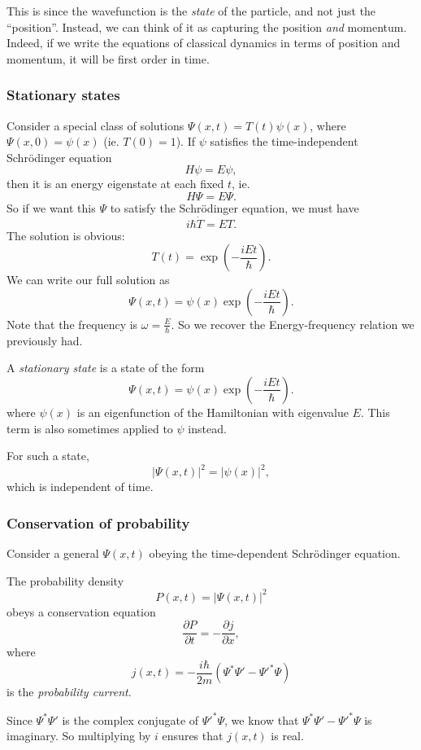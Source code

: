 \documentclass[a4paper]{article}
\begin{document}
This is since the wavefunction is the \emph{state} of the particle, and not just the ``position''. Instead, we can think of it as capturing the position \emph{and} momentum. Indeed, if we write the equations of classical dynamics in terms of position and momentum, it will be first order in time.

\subsubsection{Stationary states}
Consider a special class of solutions $\Psi(x, t) = T(t) \psi(x)$, where $\Psi(x, 0) = \psi(x)$ (ie. $T(0) = 1$). If $\psi$ satisfies the time-independent Schr\"odinger equation
\[
  H\psi = E\psi,
\]
then it is an energy eigenstate at each fixed $t$, ie.
\[
  H\Psi = E\Psi.
\]
So if we want this $\Psi$ to satisfy the Schr\"odinger equation, we must have
\[
  i\hbar \dot{T} = ET.
\]
The solution is obvious:
\[
  T(t) = \exp\left(-\frac{iEt}{\hbar}\right).
\]
We can write our full solution as
\[
  \Psi(x, t) = \psi(x) \exp\left(-\frac{iEt}{\hbar}\right).
\]
Note that the frequency is $\omega = \frac{E}{\hbar}$. So we recover the Energy-frequency relation we previously had.

\begin{defi}
  A \emph{stationary state} is a state of the form
  \[
    \Psi(x, t) = \psi(x) \exp\left(-\frac{iEt}{\hbar}\right).
  \]
  where $\psi(x)$ is an eigenfunction of the Hamiltonian with eigenvalue $E$. This term is also sometimes applied to $\psi$ instead.
\end{defi}
For such a state,
\[
  |\Psi(x, t)|^2 = |\psi(x)|^2,
\]
which is independent of time.

\subsubsection{Conservation of probability}
Consider a general $\Psi(x, t)$ obeying the time-dependent Schr\"odinger equation.

\begin{prop}
  The probability density
  \[
    P(x, t) = |\Psi(x, t)|^2
  \]
  obeys a conservation equation
  \[
    \frac{\partial P}{\partial t} = - \frac{\partial j}{\partial x},
  \]
  where
  \[
    j(x, t) = -\frac{i\hbar}{2m} (\Psi^*\Psi' - \Psi'^* \Psi)
  \]
  is the \emph{probability current}.
\end{prop}
Since $\Psi^* \Psi'$ is the complex conjugate of $\Psi'^* \Psi$, we know that $\Psi^*\Psi' - \Psi'^* \Psi$ is imaginary. So multiplying by $i$ ensures that $j(x, t)$ is real.
\end{document}
